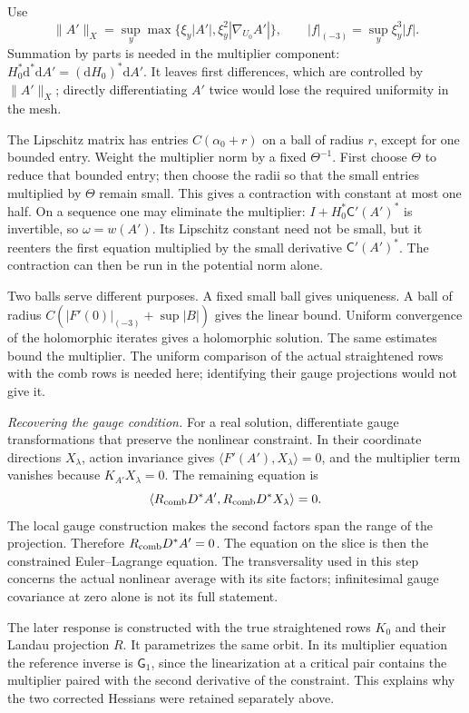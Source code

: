 \documentclass[11pt,letterpaper,reqno]{amsart}
\theoremstyle{definition}
\theoremstyle{remark}
\begin{document}
Use
\[
 \|A'\|_X=\sup_y\max\{\xi_y|A'|,
                                \xi_y^2|\nabla_{U_0}A'|\},
 \qquad |f|_{(-3)}=\sup_y\xi_y^3|f|.
\]
Summation by parts is needed in the multiplier component:
$H_0^*\mathrm d^*\mathrm d A'=(\mathrm d H_0)^*\mathrm d A'$. It leaves first differences,
which are controlled by $\|A'\|_X$; directly differentiating
$A'$ twice would lose the required uniformity in the mesh.

The Lipschitz matrix has entries $C(\alpha_0+r)$ on a ball
of radius $r$, except for one bounded entry. Weight the
multiplier norm by a fixed $\Theta^{-1}$. First choose
$\Theta$ to reduce that bounded entry; then choose the
radii so that the small entries multiplied by $\Theta$
remain small. This gives a contraction with constant at
most one half. On a sequence one may eliminate the
multiplier: $I+H_0^*\mathsf C'(A')^*$ is invertible, so
$\omega=w(A')$. Its Lipschitz constant need not be small,
but it reenters the first equation multiplied by the
small derivative $\mathsf C'(A')^*$. The contraction can
then be run in the potential norm alone.

Two balls serve different purposes. A fixed small ball
gives uniqueness. A ball of radius
$C(|F'(0)|_{(-3)}+\sup|B|)$ gives the linear bound.
Uniform convergence of the holomorphic iterates gives
a holomorphic solution. The same estimates bound the
multiplier. The uniform comparison of the actual
straightened rows with the comb rows is needed here;
identifying their gauge projections would not give it.

\emph{Recovering the gauge condition.}
For a real solution, differentiate gauge transformations
that preserve the nonlinear constraint. In their coordinate
directions $X_\lambda$, action invariance gives
$\langle F'(A'),X_\lambda\rangle=0$, and the multiplier
term vanishes because $K_{A'}X_\lambda=0$. The remaining
equation is
\[
 \langle R_{\rm comb}D^*A',
                         R_{\rm comb}D^*X_\lambda\rangle=0.
\]
The local gauge construction makes the second factors
span the range of the projection. Therefore
$R_{\rm comb}D^*A'=0$. The equation on the slice is
then the constrained Euler--Lagrange equation. The
transversality used in this step concerns the actual
nonlinear average with its site factors; infinitesimal
gauge covariance at zero alone is not its full statement.

The later response is constructed with the true
straightened rows $K_0$ and their Landau projection $R$.
It parametrizes the same orbit. In its multiplier
equation the reference inverse is $\mathsf G_1$, since
the linearization at a critical pair contains the
multiplier paired with the second derivative of the
constraint. This explains why the two corrected
Hessians were retained separately above.
\end{document}
